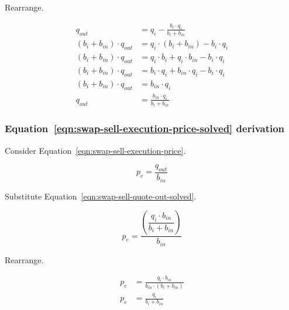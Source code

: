 \documentclass[table, twocolumn]{article}
\begin{document}
Rearrange.

\begin{align}
	q_{out}                      & = q_i - \frac{b_i \cdot q_i}{b_i + b_{in}} \nonumber \\
	(b_i + b_{in}) \cdot q_{out} & = q_i \cdot (b_i + b_{in}) - b_i \cdot q_i \nonumber \\
	(b_i + b_{in}) \cdot q_{out} & =
	q_i \cdot b_i + q_i \cdot b_{in} - b_i \cdot q_i \nonumber                          \\
	(b_i + b_{in}) \cdot q_{out} & =
	b_i \cdot q_i + b_{in} \cdot q_i - b_i \cdot q_i \nonumber                          \\
	(b_i + b_{in}) \cdot q_{out} & = b_{in} \cdot q_i \nonumber                         \\
	q_{out}                      & = \frac{b_{in} \cdot q_i}{b_i + b_{in}} \nonumber
\end{align}

\subsubsection{Equation~\ref{eqn:swap-sell-execution-price-solved} derivation}%
\label{sssec:equation-eqn-swap-sell-execution-price-solved-derivation}

Consider Equation~\ref{eqn:swap-sell-execution-price}.

\begin{equation}
	p_e = \frac{q_{out}}{b_{in}} \nonumber
\end{equation}

Substitute Equation~\ref{eqn:swap-sell-quote-out-solved}.

\begin{equation}
	p_e = \dfrac{\left(\dfrac{q_i \cdot b_{in}}{b_i + b_{in}}\right)}{b_{in}} \nonumber
\end{equation}

Rearrange.

\begin{align}
	p_e & = \frac{q_i \cdot b_{in}}{b_{in} \cdot (b_i + b_{in})} \nonumber \\
	p_e & = \frac{q_i}{b_i + b_{in}} \nonumber
\end{align}
\end{document}
